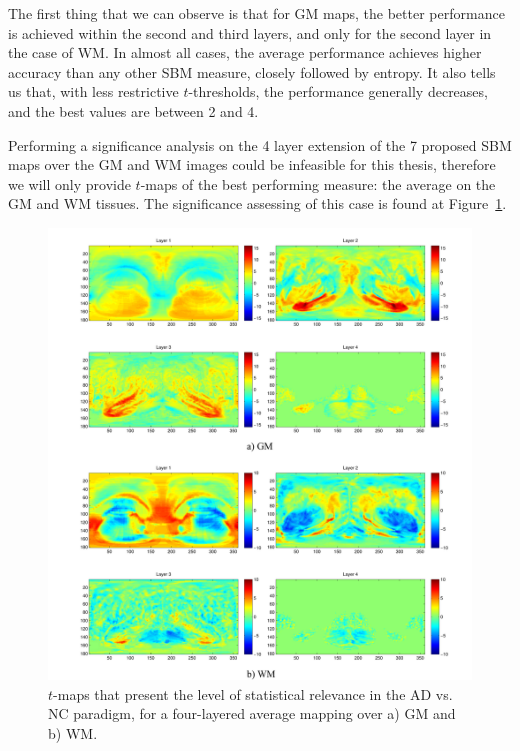 The first thing that we can observe is that for \ac{GM} maps, the better performance is achieved within the second and third layers, and only for the second layer in the case of \ac{WM}. In almost all cases, the average performance achieves higher accuracy than any other \ac{SBM} measure, closely followed by entropy. It also tells us that, with less restrictive $t$-thresholds, the performance generally decreases, and the best values are between 2 and 4. 

Performing a significance analysis on the 4 layer extension of the 7 proposed \ac{SBM} maps over the \ac{GM} and \ac{WM} images could be infeasible for this thesis, therefore we will only provide $t$-maps of the best performing measure: the average on the \ac{GM} and \ac{WM} tissues. The significance assessing of this case is found at Figure~\ref{fig:tmaplayered}.

\begin{figure}[htp]
	\centering
	\includegraphics[width=\textwidth]{Graphics/ch6/08-Tmap4LayAverage}
	\caption{$t$-maps that present the level of statistical relevance in the AD vs. NC paradigm, for a four-layered average mapping over a) \ac{GM} and b) \ac{WM}. }
	\label{fig:tmaplayered}
\end{figure} 

